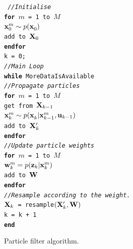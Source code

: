 \begin{figure}[h]
{ \tt %
\hspace*{.1cm} {\it //Initialise} \\
\hspace*{.1cm} {\bf for} $m$ = 1 to $M$ \\
\hspace*{.5cm}  $\x{0}{}{m} \sample{}{} p(\x{0}{}{})$\\
\hspace*{.5cm}  add  to ${\bf X}_0$\\
\hspace*{.1cm} {\bf endfor}\\
\hspace*{.1cm} k = 0; \\
\hspace*{.1cm} {\it //Main Loop} \\
\hspace*{.1cm} {\bf while} MoreDataIsAvailable \\
\hspace*{.5cm}   {\it //Propagate particles} \\
\hspace*{.5cm}   {\bf for} $m$ = 1 to $M$ \\
\hspace*{.9cm}      get  from ${\bf X}_{k-1}$\\
\hspace*{.9cm}      $\x{k}{}{m} \sample{}{} p(\x{k}{}{} 
                      |\x{k-1}{}{m}, \U{k-1})$\\
\hspace*{.9cm}      add  to ${\bf X}_k^\prime$\\
\hspace*{.5cm}   {\bf endfor}\\
\hspace*{.5cm}   {\it //Update particle weights}\\
\hspace*{.5cm}   {\bf for} $m$ = 1 to $M$ \\
\hspace*{.9cm}      $\w{k}{}{m} = p(\z{k} | \x{k}{}{m})$\\
\hspace*{.9cm}      add  to ${\bf W}$\\
\hspace*{.5cm}   {\bf endfor}\\
\hspace*{.5cm}   {\it //Resample according to the weight.}\\
\hspace*{.5cm}  ${\bf X}_k$ = resample$({\bf X}_k^\prime, {\bf W})$\\
\hspace*{.5cm}  k = k + 1\\
\hspace*{.1cm} {\bf end}
}
\caption{Particle filter algorithm.}
\label{fig:pf_algorithm}
\end{figure}

